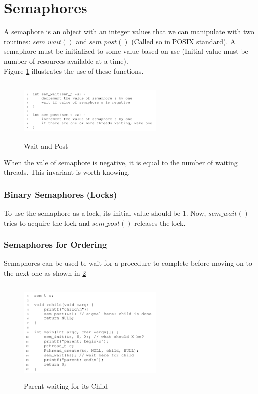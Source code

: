 \section{Semaphores}

A semaphore is an object with an integer values that we can manipulate with two
routines: $sem\_wait()$ and $sem\_post()$ (Called so in POSIX standard). A 
semaphore must be initialized to some value based on use (Initial value must be
number of resources available at a time).\\

Figure \ref{312} illustrates the use of these functions.

\begin{figure}[h!]
    \label{312}
    \begin{center}
        \includegraphics[width=7cm, height=3cm]{img/312.png}
        \caption{Wait and Post}
    \end{center}
\end{figure}

When the vale of semaphore is negative, it is equal to the number of waiting
threads. This invariant is worth knowing.

\subsubsection{Binary Semaphores (Locks)}

To use the semaphore as a lock, its initial value should be 1. Now, $sem\_wait()$
tries to acquire the lock and $sem\_post()$ releases the lock.

\subsubsection{Semaphores for Ordering}

Semaphores can be used to wait for a procedure to complete before moving on
to the next one as shown in \ref{316}

\begin{figure}[h!]
    \label{316}
    \begin{center}
        \includegraphics[width=7cm, height=5cm]{img/316.png}
        \caption{Parent waiting for its Child}
    \end{center}
\end{figure}

